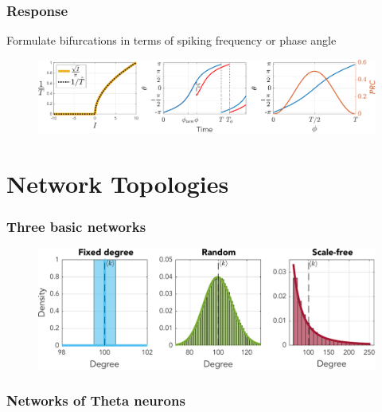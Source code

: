 \begin{frame}
\frametitle{Response}
\tabitem Formulate bifurcations in terms of spiking frequency or phase angle
\begin{figure}[H]
\centering
\includegraphics[width = \textwidth]{../Figures/ThetaNeuronfIandPRC.pdf}
\label{fig:ThetaNeuronfIandPRC}
\end{figure}
\end{frame}



\section{Network Topologies}
\begin{frame}
\frametitle{Three basic networks}
\begin{figure}[H]
\centering
\includegraphics[width = \textwidth]{../Figures/Distributions/1D.pdf}
\label{fig:1Dpdfs}
\end{figure}
\end{frame}

\begin{frame}
\frametitle{Networks of Theta neurons}

\end{frame}



